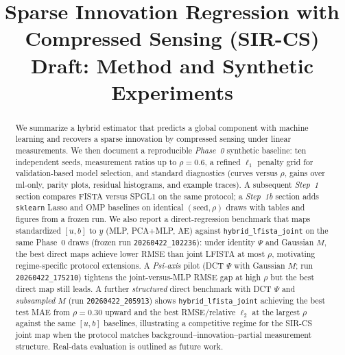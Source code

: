 \documentclass[11pt]{article}
\title{Sparse Innovation Regression with Compressed Sensing (SIR-CS)\\Draft: Method and Synthetic Experiments}
\author{}
\date{}
\begin{document}
\maketitle

\begin{abstract}
We summarize a hybrid estimator that predicts a global component with machine learning and recovers a sparse innovation by compressed sensing under linear measurements.
We then document a reproducible \emph{Phase~0} synthetic baseline: ten independent seeds, measurement ratios up to $\rho=0.6$, a refined $\ell_1$ penalty grid for validation-based model selection, and standard diagnostics (curves versus $\rho$, gains over ml-only, parity plots, residual histograms, and example traces).
A subsequent \emph{Step~1} section compares FISTA versus SPGL1 on the same protocol; a \emph{Step~1b} section adds \texttt{sklearn} Lasso and OMP baselines on identical $(\mathrm{seed},\rho)$ draws with tables and figures from a frozen run.
We also report a direct-regression benchmark that maps standardized $[u,b]$ to $y$ (MLP, PCA+MLP, AE) against \texttt{hybrid\_lfista\_joint} on the same Phase~0 draws (frozen run \texttt{20260422\_102236}): under identity $\Psi$ and Gaussian $M$, the best direct maps achieve lower RMSE than joint LFISTA at most $\rho$, motivating regime-specific protocol extensions.
A \emph{Psi-axis} pilot (DCT $\Psi$ with Gaussian $M$; run \texttt{20260422\_175210}) tightens the joint-versus-MLP RMSE gap at high $\rho$ but the best direct map still leads.
A further \emph{structured} direct benchmark with DCT $\Psi$ and \emph{subsampled} $M$ (run \texttt{20260422\_205913}) shows \texttt{hybrid\_lfista\_joint} achieving the best test MAE from $\rho=0.30$ upward and the best RMSE/relative $\ell_2$ at the largest $\rho$ against the same $[u,b]$ baselines, illustrating a competitive regime for the SIR-CS joint map when the protocol matches background--innovation--partial measurement structure.
Real-data evaluation is outlined as future work.
\end{abstract}








\appendix


\end{document}
